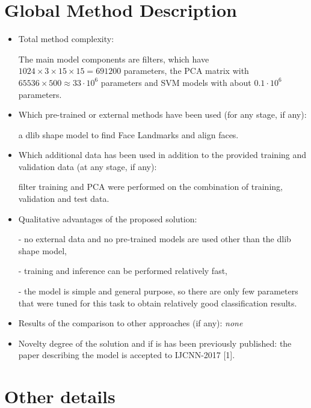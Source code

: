 \documentclass{article}
\begin{document}
\section{Global Method Description}

\begin{itemize}
\item Total method complexity: 

The main model components are filters, which have $1024\times3\times15\times15=691200$ parameters, the PCA matrix with $65536 \times 500\approx33\cdot10^6$ parameters and SVM models with about $0.1\cdot10^6$ parameters.

\item Which pre-trained or external methods have been used (for any stage, if any): 

a dlib shape model to find Face Landmarks and align faces.

\item Which additional data has been used in addition to the provided training and validation data (at any stage, if any): 

filter training and PCA were performed on the combination of training, validation and test data.

\item Qualitative advantages of the proposed solution: 

- no external data and no pre-trained models are used other than the dlib shape model, 

- training and inference can be performed relatively fast,

- the model is simple and general purpose, so there are only few parameters that were  tuned for this task to obtain relatively good classification results.

\item Results of the comparison to other approaches (if any): \textit{none}

\item Novelty degree of the solution and if is has been previously published: the paper describing the model is accepted to IJCNN-2017 [1].
\end{itemize}

\section{Other details}
\end{document}
